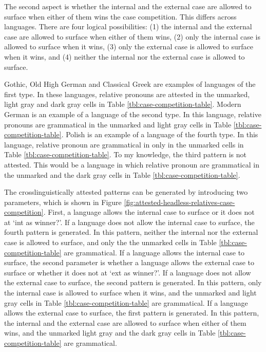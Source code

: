 The second aspect is whether the internal and the external case are allowed to surface when either of them wins the case competition. This differs across languages. There are four logical possibilities: (1) the internal and the external case are allowed to surface when either of them wins, (2) only the internal case is allowed to surface when it wins, (3) only the external case is allowed to surface when it wins, and (4) neither the internal nor the external case is allowed to surface.

Gothic, Old High German and Classical Greek are examples of languages of the first type. In these languages, relative pronouns are attested in the unmarked, light gray and dark gray cells in Table \ref{tbl:case-competition-table}.
Modern German is an example of a language of the second type. In this language, relative pronouns are grammatical in the unmarked and light gray cells in Table \ref{tbl:case-competition-table}.
Polish is an example of a language of the fourth type. In this language, relative pronoun are grammatical in only in the unmarked cells in Table \ref{tbl:case-competition-table}.
To my knowledge, the third pattern is not attested. This would be a language in which relative pronoun are grammatical in the unmarked and the dark gray cells in Table \ref{tbl:case-competition-table}.

The crosslinguistically attested patterns can be generated by introducing two parameters, which is shown in Figure \ref{fig:attested-headless-relatives-case-competition}.
First, a language allows the internal case to surface or it does not at `\ac{int} as winner?'.
If a language does not allow the internal case to surface, the fourth pattern is generated. In this pattern, neither the internal nor the external case is allowed to surface, and only the the unmarked cells in Table \ref{tbl:case-competition-table} are grammatical.
If a language allows the internal case to surface, the second parameter is whether a language allows the external case to surface or whether it does not at `\ac{ext} as winner?'.
If a language does not allow the external case to surface, the second pattern is generated. In this pattern, only the internal case is allowed to surface when it wins, and the unmarked and light gray cells in Table \ref{tbl:case-competition-table} are grammatical.
If a language allows the external case to surface, the first pattern is generated. In this pattern, the internal and the external case are allowed to surface when either of them wins, and the unmarked light gray and the dark gray cells in Table \ref{tbl:case-competition-table} are grammatical.

